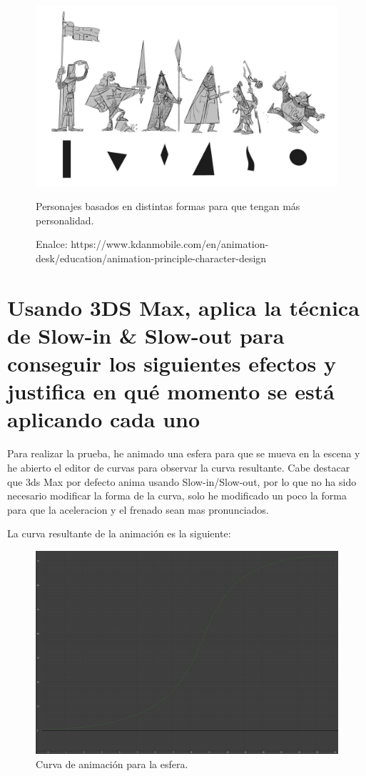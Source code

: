 \documentclass{article}
\begin{document}
\begin{figure}[H]
    \centering
    \includegraphics[width=\textwidth]{imagenes/appeal.jpg}
    \caption{Personajes basados en distintas formas para que tengan más personalidad.}
    \caption{Enalce: https://www.kdanmobile.com/en/animation-desk/education/animation-principle-character-design}
\end{figure}

\section{Usando 3DS Max, aplica la técnica de Slow-in \& Slow-out para conseguir los siguientes efectos y justifica en qué momento se está aplicando cada uno}

Para realizar la prueba, he animado una esfera para que se mueva en la escena y he abierto el editor de curvas para observar la curva resultante. Cabe destacar que 3ds Max por defecto anima usando Slow-in/Slow-out, por lo que no ha sido necesario modificar la forma de la curva, solo he modificado un poco la forma para que la aceleracion y el frenado sean mas pronunciados.

\bigskip

La curva resultante de la animación es la siguiente:

\begin{figure}[H]
    \centering
    \includegraphics[width=\textwidth]{imagenes/curva.png}
    \caption{Curva de animación para la esfera.}
\end{figure}
\end{document}
